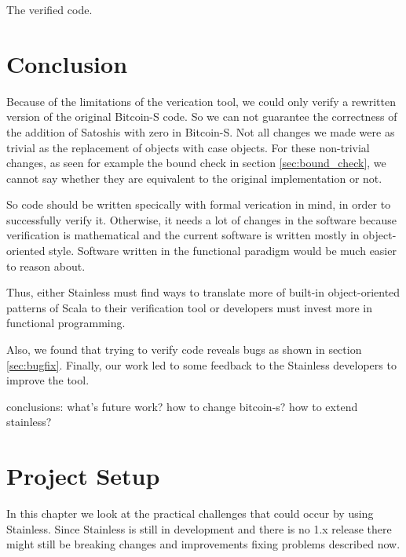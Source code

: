 \documentclass[runningheads]{llncs}
\newcommand{\todo}[1]{{\par \color{red}#1}}
\begin{document}
The verified code.









\section{Conclusion}
\label{chap:conclusion}

Because of the limitations of the verication tool, we could only
verify a rewritten version of the original Bitcoin-S code.  So we can
not guarantee the correctness of the addition of Satoshis with zero in
Bitcoin-S.  Not all changes we made were as trivial as the replacement
of objects with case objects.  For these non-trivial changes, as seen
for example the bound check in section \ref{sec:bound_check}, we
cannot say whether they are equivalent to the original implementation
or not.

So code should be written specically with formal verication in mind,
in order to successfully verify it.  Otherwise, it needs a lot of
changes in the software because verification is mathematical and the
current software is written mostly in object-oriented style.  Software
written in the functional paradigm would be much easier to reason
about.

Thus, either Stainless must find ways to translate more of built-in
object-oriented patterns of Scala to their verification tool or
developers must invest more in functional programming.

Also, we found that trying to verify code reveals bugs as shown in
section \ref{sec:bugfix}.  Finally, our work led to some feedback to
the Stainless developers to improve the tool.

\todo{conclusions: what's future work? how to
  change bitcoin-s? how to extend stainless?}





\appendix
\section{Project Setup}

In this chapter we look at the practical challenges that could occur
by using Stainless.  Since Stainless is still in development and there
is no 1.x release there might still be breaking changes and
improvements fixing problems described now.
\end{document}
